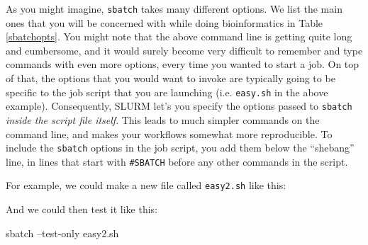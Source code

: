\documentclass[]{krantz}
\makeatletter
\newenvironment{Shaded}{\begin{snugshade}}{\end{snugshade}}
\newcommand{\BuiltInTok}[1]{#1}
\newcommand{\CommentTok}[1]{\textcolor[rgb]{0.37,0.37,0.37}{\textit{#1}}}
\newcommand{\ExtensionTok}[1]{#1}
\newcommand{\FunctionTok}[1]{\textcolor[rgb]{0,0,0}{#1}}
\newcommand{\NormalTok}[1]{#1}
\newcommand{\OperatorTok}[1]{\textcolor[rgb]{0.43,0.43,0.43}{\textbf{#1}}}
\newcommand{\StringTok}[1]{\textcolor[rgb]{0.5,0.5,0.5}{#1}}
\newcommand{\VariableTok}[1]{\textcolor[rgb]{0,0,0}{#1}}
\newenvironment{kframe}{%
\medskip{}
\setlength{\fboxsep}{.8em}
 \def\at@end@of@kframe{}%
 \ifinner\ifhmode%
  \def\at@end@of@kframe{\end{minipage}}%
  \begin{minipage}{\columnwidth}%
 \fi\fi%
 \def\FrameCommand##1{\hskip\@totalleftmargin \hskip-\fboxsep
 \colorbox{shadecolor}{##1}\hskip-\fboxsep
     \hskip-\linewidth \hskip-\@totalleftmargin \hskip\columnwidth}%
 \MakeFramed {\advance\hsize-\width
   \@totalleftmargin\z@ \linewidth\hsize
   \@setminipage}}%
 {\par\unskip\endMakeFramed%
 \at@end@of@kframe}
\renewenvironment{Shaded}{\begin{kframe}}{\end{kframe}}
\makeatother
\begin{document}
As you might imagine, \texttt{sbatch} takes many different options. We list the main ones that you will
be concerned with while doing bioinformatics in Table \ref{sbatchopts}. You might note
that the above command line is getting quite long and cumbersome, and it would surely become
very difficult to remember and type commands with even more options, every time you wanted to start a job.
On top of that, the options that you would want to invoke are typically going to be specific to the job
script that you are launching (i.e. \texttt{easy.sh} in the above example). Consequently, SLURM
let's you specify the options passed to \texttt{sbatch} \emph{inside the script file itself}. This leads
to much simpler commands on the command line, and makes your workflows somewhat more reproducible.
To include the \texttt{sbatch} options in the job script, you add them below the ``shebang'' line, in lines
that start with \texttt{\#SBATCH} before any other commands in the script.

For example, we could make a new file called \texttt{easy2.sh} like this:

\begin{Shaded}
\end{Shaded}

And we could then test it like this:

\begin{Shaded}
\begin{Highlighting}[]
\ExtensionTok{sbatch}\NormalTok{ --test-only easy2.sh}
\end{Highlighting}
\end{Shaded}
\end{document}
